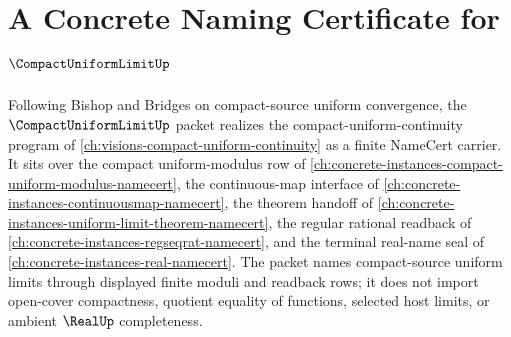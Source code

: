 \chapter{A Concrete Naming Certificate for $\CompactUniformLimitUp$}
\label{ch:concrete-instances-compact-uniform-limit-namecert}

Following Bishop and Bridges on compact-source uniform convergence, the $\CompactUniformLimitUp$ packet realizes the compact-uniform-continuity program of \autoref{ch:visions-compact-uniform-continuity} as a finite NameCert carrier. It sits over the compact uniform-modulus row of \autoref{ch:concrete-instances-compact-uniform-modulus-namecert}, the continuous-map interface of \autoref{ch:concrete-instances-continuousmap-namecert}, the theorem handoff of \autoref{ch:concrete-instances-uniform-limit-theorem-namecert}, the regular rational readback of \autoref{ch:concrete-instances-regseqrat-namecert}, and the terminal real-name seal of \autoref{ch:concrete-instances-real-namecert}. The packet names compact-source uniform limits through displayed finite moduli and readback rows; it does not import open-cover compactness, quotient equality of functions, selected host limits, or ambient $\RealUp$ completeness.

